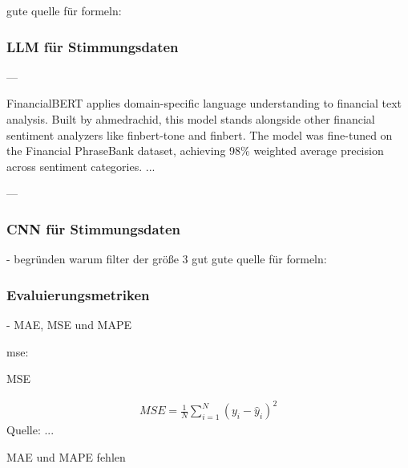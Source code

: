 gute quelle für formeln: \autocite{guan2020stockprice}

\subsubsection{LLM für Stimmungsdaten}\label{sec:theorie_llm}
---

FinancialBERT applies domain-specific language understanding to financial text analysis. Built by ahmedrachid, this model stands alongside other financial sentiment analyzers like finbert-tone and finbert. The model was fine-tuned on the Financial PhraseBank dataset, achieving 98\% weighted average precision across sentiment categories.
...

---
\autocite{hazourli2022financialbert}


\subsubsection{CNN für Stimmungsdaten}\label{sec:theorie_cnn}

- begründen warum filter der größe 3 gut
gute quelle für formeln: \autocite{guan2020stockprice}

\subsubsection{Evaluierungsmetriken}\label{sec:theorie_evalmetrics}

- \ac{MAE}, \ac{MSE} und \ac{MAPE}  
\autocite[Kap. 4.3]{xie2024deep}

mse:

\begin{formel}[h]
	\caption{\ac{MSE}}
	\label{frm:mse}
	\begin{align}
		MSE = \frac{1}{N} \sum_{i=1}^{N} (y_i - \hat{y}_i)^2
	\end{align}
	\vspace{0.5em}
	\normalsize{Quelle: ...}
	\vspace{-1.0em}
\end{formel}

MAE und MAPE fehlen





